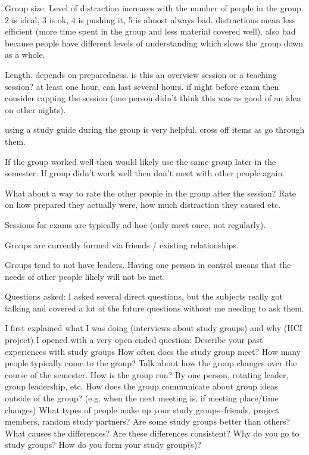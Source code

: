 \documentclass[conference]{IEEEtran}
\begin{document}
Group size.
  Level of distraction increases with the number of people in the group.
  2 is ideal, 3 is ok, 4 is pushing it, 5 is almost always bad.
  distractions mean less efficient (more time spent in the group and less material covered well).
  also bad because people have different levels of understanding which slows the group down as a whole.

Length.
  depends on preparedness.
    is this an overview session or a teaching session?
  at least one hour, can last several hours.
      if night before exam then consider capping the session (one person didn't think this was as good of an idea on other nights).

using a study guide during the group is very helpful.
  cross off items as go through them.

If the group worked well then would likely use the same group later in the semester.
If group didn't work well then don't meet with other people again.

What about a way to rate the other people in the group after the session?  
Rate on how prepared they actually were, how much distraction they caused etc.

Sessions for exams are typically ad-hoc (only meet once, not regularly).

Groups are currently formed via friends / existing relationships.

Groups tend to not have leaders.  
Having one person in control means that the needs of other people likely will not be met.

Questions asked:
I asked several direct questions, but the subjects really got talking and covered a lot of the future questions without me needing to ask them.

I first explained what I was doing (interviews about study groups) and why (HCI project)
I opened with a very open-ended question:  Describe your past experiences with study groups
How often does the study group meet?
How many people typically come to the group?
Talk about how the group changes over the course of the semester.
How is the group run?  By one person, rotating leader, group leadership, etc.
How does the group communicate about group ideas outside of the group? (e.g. when the next meeting is, if meeting place/time changes)
What types of people make up your study groups--friends, project members, random study partners?
Are some study groups better than others?  What causes the differences?  Are these differences consistent?
Why do you go to study groups?
How do you form your study group(s)?



\end{document}
